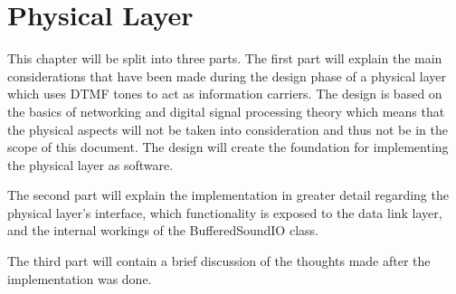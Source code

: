 \chapter{Physical Layer}\label{chap:physical}
This chapter will be split into three parts. The first part will explain the main considerations that have been made during the design phase of a physical layer which uses DTMF tones to act as information carriers. The design is based on the basics of networking and digital signal processing theory which means that the physical aspects will not be taken into consideration and thus not be in the scope of this document. The design will create the foundation for implementing the physical layer as software.

The second part will explain the implementation in greater detail regarding the physical layer's interface, which functionality is exposed to the data link layer, and the internal workings of the BufferedSoundIO class.

The third part will contain a brief discussion of the thoughts made after the implementation was done.

